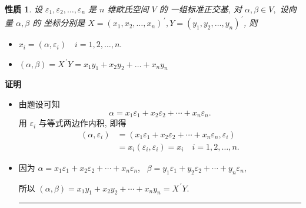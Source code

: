 \documentclass[13pt]{beamer}
\newtheorem*{prop}{性质}
\def\qed{\nopagebreak\hfill{\rule{4pt}{7pt}}\medbreak}
\def\pf{{\bf 证明~~ }}
\begin{document}
\begin{frame}
\begin{prop}
	设 $\varepsilon_{1}, \varepsilon_{2}, \dots, \varepsilon_{n}$ 是 $n$ 维欧氏空间 $V$ 的
	一组标准正交基, 对 $\alpha, \beta \in V,$ 设向量 $\alpha, \beta$ 的 坐标分别是 $X=\left(x_{1}, x_{2}, \ldots, x_{n}\right)^{\, \prime}, Y=\left(y_{1}, y_{2}, \ldots, y_{n}\right)^{\, \prime}$, 则
	\begin{itemize}
		\item $x_{i}=\left(\alpha, \varepsilon_{i}\right) \quad i=1,2, \dots, n.$
		\item  $(\alpha, \beta)=X^{\, \prime} Y=x_{1} y_{1}+x_{2} y_{2}+\ldots+x_{n} y_{n}$
	\end{itemize}
\end{prop}

\pf 
\small{
	\begin{itemize}
\item 由题设可知
\[
{\alpha}=x_{1} {\varepsilon}_{1}+x_{2} {\varepsilon}_{2}+\cdots+{x}_{n} {\varepsilon}_{n}.
\]
用 ${\varepsilon}_{i}$ 与等式两边作内积, 即得
\begin{align*}
\left( \alpha, \varepsilon_{i}\right)  
& =\left( x_{1} {\varepsilon}_{1}+x_{2} {\varepsilon}_{2}+\cdots+{x}_{n} {\varepsilon}_{n}, \varepsilon_{i} \right)\\
& = x_i ({\varepsilon}_{i},{\varepsilon}_{i} ) =x_i \quad i=1,2, \ldots, n.
\end{align*}
\item 因为\quad \quad
${\alpha}=x_{1} {\varepsilon}_{1}+x_{2} {\varepsilon}_{2}+\cdots+x_{n} {\varepsilon}_{n}$, \,
${\beta}=y_{1} {\varepsilon}_{1}+y_{2} {\varepsilon}_{2}+\cdots+y_{n} {\varepsilon}_{n}$,

所以\qquad \qquad \qquad
$
({\alpha}, {\beta})=x_{1} y_{1}+x_{2} y_{2}+\cdots+x_{n} y_{n}={X}^{\, \prime} {Y}.
$\qed
	\end{itemize}

}
\end{frame}
\end{document}
